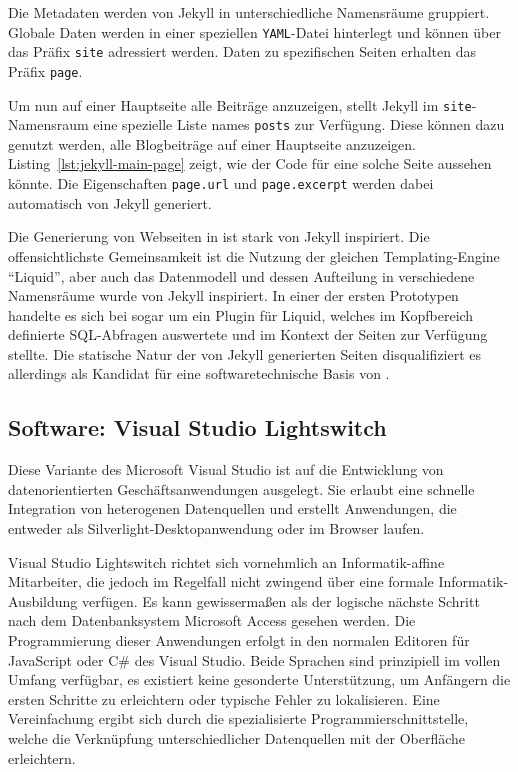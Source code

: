 Die Metadaten werden von Jekyll in unterschiedliche Namensräume gruppiert. Globale Daten werden in einer speziellen \texttt{YAML}-Datei hinterlegt und können über das Präfix \texttt{site} adressiert werden. Daten zu spezifischen Seiten erhalten das Präfix \texttt{page}.

Um nun auf einer Hauptseite alle Beiträge anzuzeigen, stellt Jekyll im \texttt{site}-Namensraum eine spezielle Liste names \texttt{posts} zur Verfügung. Diese können dazu genutzt werden, alle Blogbeiträge auf einer Hauptseite anzuzeigen. Listing~\ref{lst:jekyll-main-page} zeigt, wie der Code für eine solche Seite aussehen könnte. Die Eigenschaften \texttt{page.url} und \texttt{page.excerpt} werden dabei automatisch von Jekyll generiert.

Die Generierung von Webseiten in \idename{} ist stark von Jekyll inspiriert. Die offensichtlichste Gemeinsamkeit ist die Nutzung der gleichen Templating-Engine "`Liquid"', aber auch das Datenmodell und dessen Aufteilung in verschiedene Namensräume wurde von Jekyll inspiriert. In einer der ersten Prototypen handelte es sich bei \idename{} sogar um ein Plugin für Liquid, welches im Kopfbereich definierte SQL-Abfragen auswertete und im Kontext der Seiten zur Verfügung stellte. Die statische Natur der von Jekyll generierten Seiten disqualifiziert es allerdings als Kandidat für eine softwaretechnische Basis von \idename{}.

\subsection{Software: Visual Studio Lightswitch}

Diese Variante des Microsoft Visual Studio ist auf die Entwicklung von datenorientierten Geschäftsanwendungen ausgelegt. Sie erlaubt eine schnelle Integration von heterogenen Datenquellen und erstellt Anwendungen, die entweder als Silverlight-Desktopanwendung oder im Browser laufen.

Visual Studio Lightswitch richtet sich vornehmlich an Informatik-affine Mitarbeiter, die jedoch im Regelfall nicht zwingend über eine formale Informatik-Ausbildung verfügen. Es kann gewissermaßen als der logische nächste Schritt nach dem Datenbanksystem Microsoft Access gesehen werden. Die Programmierung dieser Anwendungen erfolgt in den normalen Editoren für JavaScript oder C\# des Visual Studio. Beide Sprachen sind prinzipiell im vollen Umfang verfügbar, es existiert keine gesonderte Unterstützung, um Anfängern die ersten Schritte zu erleichtern oder typische Fehler zu lokalisieren. Eine Vereinfachung ergibt sich durch die spezialisierte Programmierschnittstelle, welche die Verknüpfung unterschiedlicher Datenquellen mit der Oberfläche erleichtern.


